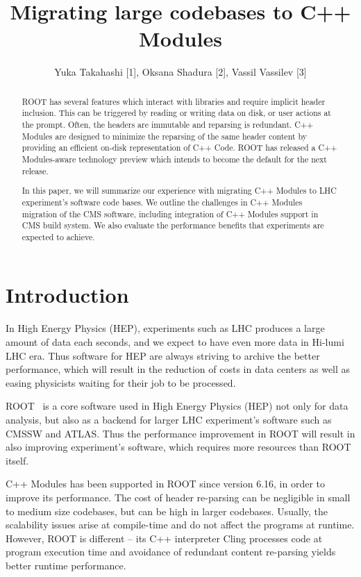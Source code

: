 \documentclass[12pt]{iopart}
\begin{document}
\title{Migrating large codebases to C++ Modules}

\author{Yuka Takahashi [1], Oksana Shadura [2], Vassil Vassilev [3]}
\address{[1] University of Tokyo, [2] University of Nebraska-Lincoln, [3] Princeton University}

\begin{abstract}
ROOT has several features which interact with libraries and require implicit header inclusion. This can be triggered by reading or writing data on disk, or user actions at the prompt. Often, the headers are immutable and reparsing is redundant. C++ Modules are designed to minimize the reparsing of the same header content by providing an efficient on-disk representation of C++ Code. ROOT has released a C++ Modules-aware technology preview which intends to become the default for the next release.

In this paper, we will summarize our experience with migrating C++ Modules to LHC experiment's software code bases. We outline the challenges in C++ Modules migration of the CMS software, including integration of C++ Modules support in CMS build system. We also evaluate the performance benefits that experiments are expected to achieve.
\end{abstract}

\section{Introduction}
\label{intro}

In High Energy Physics (HEP), experiments such as LHC \cite{lhc} produces a large amount of data each seconds, and we expect to have even more data in Hi-lumi LHC \cite{hilumi} era. Thus software for HEP are always striving to archive the better performance, which will result in the reduction of costs in data centers as well as easing physicists waiting for their job to be processed.

ROOT~\cite{root} is a core software used in High Energy Physics (HEP) not only for data analysis, but also as a backend for larger LHC experiment's software such as CMSSW and ATLAS. Thus the performance improvement in ROOT will result in also improving experiment's software, which requires more resources than ROOT itself.

C++ Modules \cite{vassil-paper} has been supported in ROOT since version 6.16, in order to improve its performance. The cost of header re-parsing can be negligible in small to medium size codebases, but can be  high in larger codebases. Usually, the scalability issues arise at compile-time and do not affect the programs at runtime. However, ROOT is different -- its C++ interpreter Cling processes code at program execution time and avoidance of redundant content re-parsing yields better runtime performance.
\end{document}
